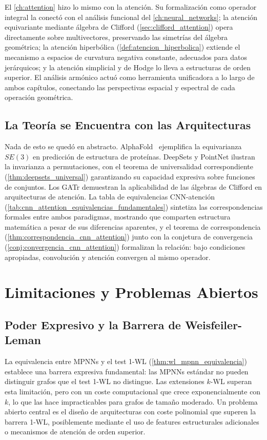 El \autoref{ch:attention} hizo lo mismo con la atención. Su formalización como operador integral la conectó con el análisis funcional del \autoref{ch:neural_networks}; la atención equivariante mediante álgebra de Clifford (\autoref{sec:clifford_attention}) opera directamente sobre multivectores, preservando las simetrías del álgebra geométrica; la atención hiperbólica (\autoref{def:atencion_hiperbolica}) extiende el mecanismo a espacios de curvatura negativa constante, adecuados para datos jerárquicos; y la atención simplicial y de Hodge lo lleva a estructuras de orden superior. El análisis armónico actuó como herramienta unificadora a lo largo de ambos capítulos, conectando las perspectivas espacial y espectral de cada operación geométrica.

\subsection{La Teoría se Encuentra con las Arquitecturas}

Nada de esto se quedó en abstracto. AlphaFold~\citep{jumper2021alphafold} ejemplifica la equivarianza $SE(3)$ en predicción de estructura de proteínas. DeepSets y PointNet ilustran la invarianza a permutaciones, con el teorema de universalidad correspondiente (\autoref{thm:deepsets_universal}) garantizando su capacidad expresiva sobre funciones de conjuntos. Los \gls{GATr} demuestran la aplicabilidad de las álgebras de Clifford en arquitecturas de atención. La tabla de equivalencias \gls{CNN}-atención (\autoref{tab:cnn_attention_equivalencias_fundamentales}) sintetiza las correspondencias formales entre ambos paradigmas, mostrando que comparten estructura matemática a pesar de sus diferencias aparentes, y el teorema de correspondencia (\autoref{thm:correspondencia_cnn_attention}) junto con la conjetura de convergencia (\autoref{conj:convergencia_cnn_attention}) formalizan la relación: bajo condiciones apropiadas, convolución y atención convergen al mismo operador.


\section{Limitaciones y Problemas Abiertos}

\subsection{Poder Expresivo y la Barrera de Weisfeiler-Leman}

La equivalencia entre \glspl{MPNN} y el test 1-WL (\autoref{thm:wl_mpnn_equivalencia}) establece una barrera expresiva fundamental: las \glspl{MPNN} estándar no pueden distinguir grafos que el test 1-WL no distingue. Las extensiones $k$-WL superan esta limitación, pero con un coste computacional que crece exponencialmente con $k$, lo que las hace impracticables para grafos de tamaño moderado. Un problema abierto central es el diseño de arquitecturas con coste polinomial que superen la barrera 1-WL, posiblemente mediante el uso de features estructurales adicionales o mecanismos de atención de orden superior.

